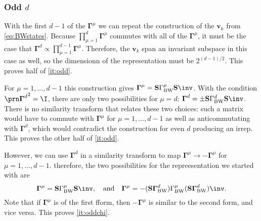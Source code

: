 \documentclass[11pt]{article}
\newcommand{\Gammab}{\boldsymbol{\Gamma}}
\renewcommand{\S}{\mathbf{S}}
\begin{document}
\begin{appendix}

\subsubsection{Odd \texorpdfstring{\(d\)}{d}}\label{sec:oddclass}

With the first \(d-1\) of the \(\Gammab^\mu\) we can repeat the construction of the \(\mathbf{v}_k\) from \cref{eq:BWstates}.
Because \(\prod^{d}_{\mu = 1} \Gammab^\mu\) commutes with all of the \(\Gammab^\mu\), it must be the case that \( \Gammab^d \propto \prod^{d-1}_{\mu = 1} \Gammab^\mu \).
Therefore, the \(\mathbf{v}_k\) span an invariant subspace in this case as well, so the dimensionn of the representation must be \(2^{(d-1)/2}\).
This proves half of \cref{it:odd}.

For \(\mu = 1,\dots,d-1\) this construction gives \( \Gammab^\mu = \S \Gamma^\mu_\text{BW} \S\inv \).
With the condition \(\Gammap[d]^2 = \I\), there are only two possibilities for \(\mu = d\): \( \Gammab^d = \pm \S \Gamma^d_\text{BW} \S\inv \).
There is no similarity transform that relates these two choices: such a matrix would have to commute with \(\Gammab^\mu\) for \(\mu = 1,\dots,d-1\) as well as anticommutating with \(\Gammab^d\), which would contradict the construction for even \(d\) producing an irrep.
This proves the other half of \cref{it:odd}.

However, we can use \(\Gammab^d\) in a similarity transform to map \(\Gammab^\mu \to - \Gammab^\mu\) for \(\mu = 1,\dots,d-1\).
therefore, the two possibilities for the repreesentation we started with are
%
\begin{equation}\label{eq:similarBWodd}
  \Gammab^\mu = \S \Gamma^\mu_\text{BW} \S\inv,
  \quad \text{and}\quad
  \Gammab^\mu = - (\S \Gammab^d_\text{BW}) \Gamma^\mu_\text{BW} (\S \Gammab^d_\text{BW})\inv.
\end{equation}
%
Note that if \(\Gammab^\mu\) is of the first fform, then \(-\Gammab^\mu\) is similar to the second form, and vice versa. 
This proves \cref{it:oddchi}.


\end{appendix}


\end{document}
